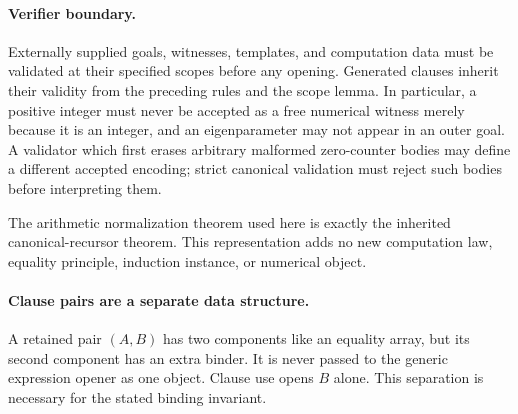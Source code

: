 \paragraph{Verifier boundary.}
Externally supplied goals, witnesses, templates, and computation data
must be validated at their specified scopes before any opening. Generated
clauses inherit their validity from the preceding rules and the scope
lemma. In particular, a positive integer must never be accepted as a
free numerical witness merely because it is an integer, and an
eigenparameter may not appear in an outer goal. A validator which first
erases arbitrary malformed zero-counter bodies may define a different
accepted encoding; strict canonical validation must reject such bodies
before interpreting them.

The arithmetic normalization theorem used here is exactly the inherited
canonical-recursor theorem. This representation adds no new computation
law, equality principle, induction instance, or numerical object.

\paragraph{Clause pairs are a separate data structure.}
A retained pair $(A,B)$ has two components like an equality array, but its
second component has an extra binder. It is never passed to the generic
expression opener as one object. Clause use opens $B$ alone. This
separation is necessary for the stated binding invariant.
